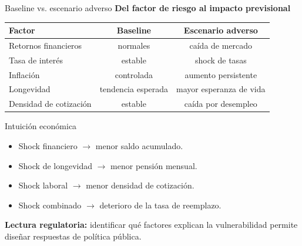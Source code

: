 \documentclass[10pt,aspectratio=169]{beamer}
\begin{document}
\begin{frame}{Baseline vs. escenario adverso}
\textbf{Del factor de riesgo al impacto previsional}

\vspace{0.2cm}

\begin{table}
\centering
\small
\begin{tabular}{lcc}
\hline
\textbf{Factor} & \textbf{Baseline} & \textbf{Escenario adverso} \\
\hline
Retornos financieros & normales & caída de mercado \\
Tasa de interés & estable & shock de tasas \\
Inflación & controlada & aumento persistente \\
Longevidad & tendencia esperada & mayor esperanza de vida \\
Densidad de cotización & estable & caída por desempleo \\
\hline
\end{tabular}
\end{table}

\vspace{0.3cm}

\begin{block}{Intuición económica}
\begin{itemize}
    \item Shock financiero $\rightarrow$ menor saldo acumulado.
    \item Shock de longevidad $\rightarrow$ menor pensión mensual.
    \item Shock laboral $\rightarrow$ menor densidad de cotización.
    \item Shock combinado $\rightarrow$ deterioro de la tasa de reemplazo.
\end{itemize}
\end{block}

\vspace{0.2cm}

\textbf{Lectura regulatoria:} identificar qué factores explican la vulnerabilidad permite diseñar respuestas de política pública.

\end{frame}
\end{document}
